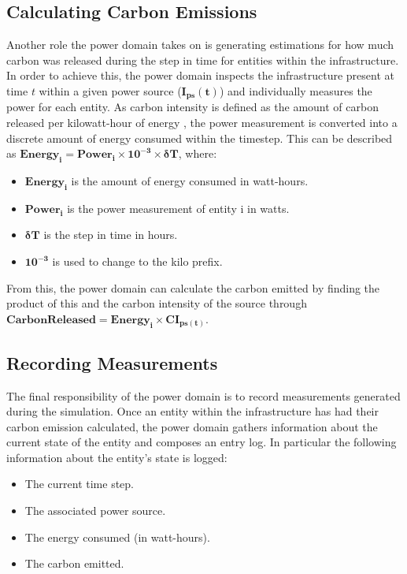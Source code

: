\documentclass{l4proj}
\begin{document}
\subsection{Calculating Carbon Emissions}\label{subsec:carbon-released}
Another role the power domain takes on is generating estimations for how much carbon was released during the step in time for entities within the infrastructure.
In order to achieve this, the power domain inspects the infrastructure present at time $t$ within a given power source ($\mathbf{I_{ps}(t)}$) and individually measures the power for each entity.
As carbon intensity is defined as the amount of carbon released per kilowatt-hour of energy \citep{owid-electricity-mix}, the power measurement is converted into a discrete amount of energy consumed within the timestep.
This can be described as $\mathbf{Energy_{i}} = \mathbf{Power_{i}} \times \mathbf{10^{-3}} \times \mathbf{\delta T}$, where:
\begin{itemize}
    \item $\mathbf{Energy_{i}}$ is the amount of energy consumed in watt-hours.
    \item $\mathbf{Power_{i}}$ is the power measurement of entity i in watts.
    \item $\mathbf{\delta T}$ is the step in time in hours.
    \item $\mathbf{10^{-3}}$ is used to change to the kilo prefix.
\end{itemize}
From this, the power domain can calculate the carbon emitted by finding the product of this and the carbon intensity of the source through $\mathbf{Carbon Released = Energy_{i} \times CI_{ps(t)}}$.

\subsection{Recording Measurements}\label{subsec:power-domain-recording-measurements}
The final responsibility of the power domain is to record measurements generated during the simulation.
Once an entity within the infrastructure has had their carbon emission calculated, the power domain gathers information about the current state of the entity and composes an entry log.
In particular the following information about the entity's state is logged:
\begin{itemize}
    \item The current time step.
    \item The associated power source.
    \item The energy consumed (in watt-hours).
    \item The carbon emitted.
\end{itemize}
\end{document}
